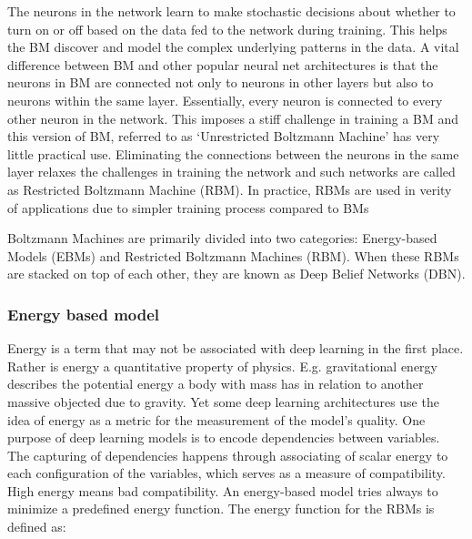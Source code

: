 The neurons in the network learn to make stochastic decisions about whether to turn on or off based on the data fed to the network during training.  This helps the BM discover and model the complex underlying patterns in the data. A vital difference between BM and other popular neural net architectures is that the neurons in BM are connected not only to neurons in other layers but also to neurons within the same layer. Essentially, every neuron is connected to every other neuron in the network.  This imposes a stiff challenge in training a BM and this version of BM, referred to as ‘Unrestricted Boltzmann Machine’ has very little practical use. Eliminating the connections between the neurons in the same layer relaxes the challenges in training the network and such networks are called as Restricted Boltzmann Machine (RBM). In practice, RBMs are used in verity of applications due to simpler training process compared to BMs

Boltzmann Machines are primarily divided into two categories: Energy-based Models (EBMs) and Restricted Boltzmann Machines (RBM). When these RBMs are stacked on top of each other, they are known as Deep Belief Networks (DBN).

\subsubsection{Energy based model}

Energy is a term that may not be associated with deep learning in the first place. Rather is energy a quantitative property of physics. E.g. gravitational energy describes the potential energy a body with mass has in relation to another massive objected due to gravity. Yet some deep learning architectures use the idea of energy as a metric for the measurement of the model’s quality.
One purpose of deep learning models is to encode dependencies between variables. The capturing of dependencies happens through associating of scalar energy to each configuration of the variables, which serves as a measure of compatibility. High energy means bad compatibility. An energy-based model tries always to minimize a predefined energy function. The energy function for the RBMs is defined as:

